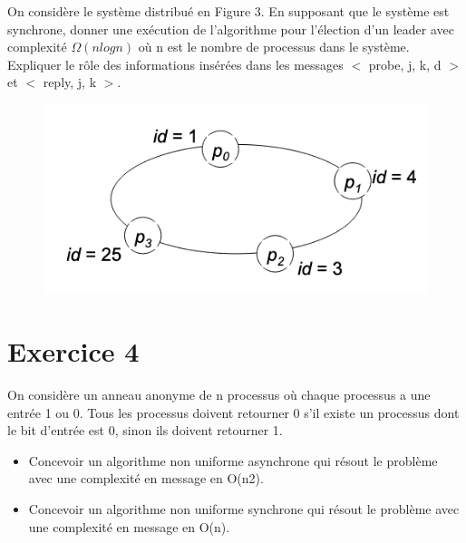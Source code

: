 \documentclass[10pt,a4paper]{article}
\begin{document}
On considère le système distribué en Figure 3. En supposant que le système est synchrone,
donner une exécution de l’algorithme pour l’élection d’un leader avec complexité $\Omega(n logn)$ où n est le nombre
de processus dans le système. Expliquer le rôle des informations insérées dans les messages $<$ probe, j, k, d $>$ et $<$ reply, j, k $>$.

\begin{figure}[h!]
    \centering
    \includegraphics{fig3.png}
    \label{fig:my_label}
\end{figure}

\section*{Exercice 4}

On considère un anneau anonyme de n processus où chaque processus a une entrée 1 ou 0.
Tous les processus doivent retourner 0 s’il existe un processus dont le bit d’entrée est 0, sinon ils doivent
retourner 1.
\begin{itemize}
    \item Concevoir un algorithme non uniforme asynchrone qui résout le problème avec une complexité en
message en O(n2).
    \item Concevoir un algorithme non uniforme synchrone qui résout le problème avec une complexité en
message en O(n).
\end{itemize}
\end{document}
